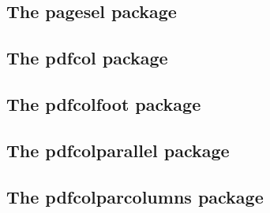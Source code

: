 \documentclass[a4paper,12pt]{article}
\makeatletter
\providecommand*{\pdfTeX}{pdf\TeX}
\newcommand*{\xpackage}[1]{\textsf{#1}}
\newcommand*{\xfile}[1]{\texttt{#1}}
\newcommand*{\tocinclude}[1]{%
  \setcounter{tocdepth}{3}%
  \begingroup
    \makeatletter
    \def\@prj{#1}%
    \let\contentsline\foreign@contentsline
  \endgroup
}
\def\foreign@contentsline#1#2#3#4{%
  \ifx\\#4\\%
    \csname l@#1\endcsname{#2}{#3}%
  \else
    \ifHy@linktocpage
      \csname l@#1\endcsname{{#2}}{%
        \hyper@linkfile{#3}{\@prj.pdf}{#4}%
      }%
    \else
      \csname l@#1\endcsname{%
        \hyper@linkfile{#2}{\@prj.pdf}{#4}%
      }{#3}%
    \fi
  \fi
}%
\newcommand*{\pkgsectformat}[1]{%
  \texorpdfstring{%
    \textcolor{link}{The} %
    \xpackage{#1} %
    \textcolor{link}{package}%
  }{#1}%
}
\makeatother
\begin{document}
\newpage
\subsection{\pkgsectformat{pagesel}}
\label{pagesel}
\begin{abstract}
Single pages or page areas can be selected for output.
\end{abstract}
\tocinclude{pagesel}

\newpage
\subsection{\pkgsectformat{pdfcol}}
\label{pdfcol}
\begin{abstract}
Since version 1.40 \pdfTeX\ supports color stacks.
The driver file \xfile{pdftex.def} for package \xpackage{color}
defines and uses a main color stack since version v0.04b.
Package \xpackage{pdfcol} is intended for package writers.
It defines macros for setting and maintaining new color stacks.
\end{abstract}
\tocinclude{pdfcol}

\newpage
\subsection{\pkgsectformat{pdfcolfoot}}
\label{pdfcolfoot}
\begin{abstract}
Since version 1.40 \pdfTeX\ supports several color stacks. This
package uses a separate color stack for footnotes that can break
across pages.
\end{abstract}
\tocinclude{pdfcolfoot}

\newpage
\subsection{\pkgsectformat{pdfcolparallel}}
\label{pdfcolparallel}
\begin{abstract}
This packages fixes bugs in \xpackage{parallel} and
improves color support by using several color stacks
that are provided by \pdfTeX\ since version 1.40.
\end{abstract}
\tocinclude{pdfcolparallel}

\newpage
\subsection{\pkgsectformat{pdfcolparcolumns}}
\label{pdfcolparcolumns}
\begin{abstract}
Since version 1.40 \pdfTeX\ supports several color stacks.
This package uses them to fix color problems in
package \xpackage{parcolumns}.
\end{abstract}
\tocinclude{pdfcolparcolumns}
\end{document}
